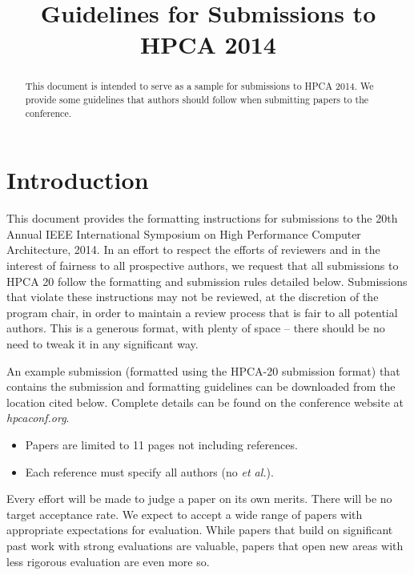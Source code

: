 \documentclass[pageno]{jpaper}
\begin{document}
\title{
Guidelines for Submissions to HPCA 2014}

\date{}
\maketitle

\thispagestyle{empty}

\begin{abstract}
This document is intended to serve as a sample for submissions to HPCA 2014.
We provide some guidelines that authors should follow when submitting papers to
the conference.
\end{abstract}

\section{Introduction}

This document provides the formatting instructions for submissions to the 20th
Annual IEEE International Symposium on High Performance Computer Architecture,
2014. In an effort to respect the efforts of reviewers and in
the interest of fairness to all prospective authors, we request that all
submissions to HPCA 20 follow the formatting and submission rules detailed
below.  Submissions that violate these instructions may not be
reviewed, at the discretion of the program chair, in order to maintain a review 
process that is fair to all potential authors.  This is a generous format,
with plenty of space -- there should be no need to tweak it in any
significant way.

An example submission (formatted using the HPCA-20 submission format) that
contains the submission and formatting guidelines can be downloaded from
the location cited below.  Complete details can be found on the
conference website at {\em hpcaconf.org}.


\begin{itemize}
\item Papers are limited to 11 pages not including references.
\item Each reference must specify all authors (no {\it et al.}).
\end{itemize}


Every effort will be made to judge a paper on its own merits. There will be no target acceptance rate. We expect to accept a wide range of papers with appropriate expectations for evaluation.
While papers that build on significant past work with strong evaluations are valuable, papers that open new areas with less rigorous evaluation are even more so.
\end{document}
